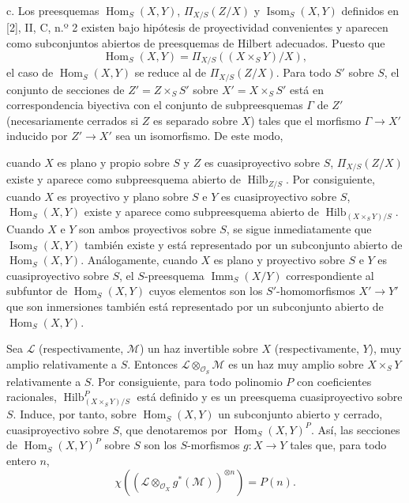 \documentclass[11pt,twoside,openany]{book}
\numberwithin{equation}{section}
\newcommand{\src}[1]{%
  \phantomsection\hypertarget{src:#1}{}%
  \marginpar{\raggedleft\footnotesize\sffamily #1}%
}
\theoremstyle{plain}
\theoremstyle{definition}
\theoremstyle{remark}
\newcommand{\FgaUnitKey}{frontmatter}
\renewcommand{\src}[1]{%
  \phantomsection\hypertarget{src:\FgaUnitKey:#1}{}%
  \marginpar{\raggedleft\footnotesize\sffamily #1}%
}
\theoremstyle{plain}
\theoremstyle{definition}
\theoremstyle{remark}
\begin{document}
\medskip
\noindent c. Los preesquemas $\operatorname{Hom}_S(X,Y)$,
$\Pi_{X/S}(Z/X)$ y $\operatorname{Isom}_S(X,Y)$ definidos en [2], II, C,
n.º 2 existen bajo hipótesis de proyectividad convenientes y aparecen como
subconjuntos abiertos de preesquemas de Hilbert adecuados. Puesto que
\[
\operatorname{Hom}_S(X,Y)=\Pi_{X/S}((X\times_SY)/X),
\]
el caso de $\operatorname{Hom}_S(X,Y)$ se reduce al de
$\Pi_{X/S}(Z/X)$. Para todo $S'$ sobre $S$, el conjunto de secciones de
$Z'=Z\times_SS'$ sobre $X'=X\times_SS'$ está en correspondencia biyectiva con
el conjunto de subpreesquemas $\Gamma$ de $Z'$ (necesariamente cerrados si $Z$
es separado sobre $X$) tales que el morfismo $\Gamma\longrightarrow X'$
inducido por $Z'\longrightarrow X'$ sea un isomorfismo. De este modo,
\src{268}
cuando $X$ es plano y propio sobre $S$ y $Z$ es cuasiproyectivo sobre $S$,
$\Pi_{X/S}(Z/X)$ existe y aparece como subpreesquema abierto de
$\operatorname{Hilb}_{Z/S}$. Por consiguiente, cuando $X$ es proyectivo y
plano sobre $S$ e $Y$ es cuasiproyectivo sobre $S$,
$\operatorname{Hom}_S(X,Y)$ existe y aparece como subpreesquema abierto de
$\operatorname{Hilb}_{(X\times_SY)/S}$. Cuando $X$ e $Y$ son ambos
proyectivos sobre $S$, se sigue inmediatamente que
$\operatorname{Isom}_S(X,Y)$ también existe y está representado por un
subconjunto abierto de $\operatorname{Hom}_S(X,Y)$. Análogamente, cuando $X$
es plano y proyectivo sobre $S$ e $Y$ es cuasiproyectivo sobre $S$, el
$S$-preesquema $\operatorname{Imm}_S(X/Y)$ correspondiente al subfuntor de
$\operatorname{Hom}_S(X,Y)$ cuyos elementos son los $S'$-homomorfismos
$X'\longrightarrow Y'$ que son inmersiones también está representado por un
subconjunto abierto de $\operatorname{Hom}_S(X,Y)$.

Sea $\mathcal L$ (respectivamente, $\mathcal M$) un haz invertible sobre $X$
(respectivamente, $Y$), muy amplio relativamente a $S$. Entonces
$\mathcal L\otimes_{\mathcal O_S}\mathcal M$ es un haz muy amplio sobre
$X\times_SY$ relativamente a $S$. Por consiguiente, para todo polinomio $P$
con coeficientes racionales, $\operatorname{Hilb}^P_{(X\times_SY)/S}$ está
definido y es un preesquema cuasiproyectivo sobre $S$. Induce, por tanto,
sobre $\operatorname{Hom}_S(X,Y)$ un subconjunto abierto y cerrado,
cuasiproyectivo sobre $S$, que denotaremos por
$\operatorname{Hom}_S(X,Y)^P$. Así, las secciones de
$\operatorname{Hom}_S(X,Y)^P$ sobre $S$ son los $S$-morfismos
$g:X\longrightarrow Y$ tales que, para todo entero $n$,
\[
\chi\!\left(\left(\mathcal L\otimes_{\mathcal O_X}g^*(\mathcal M)\right)^{
\otimes n}\right)=P(n).
\]
\end{document}
